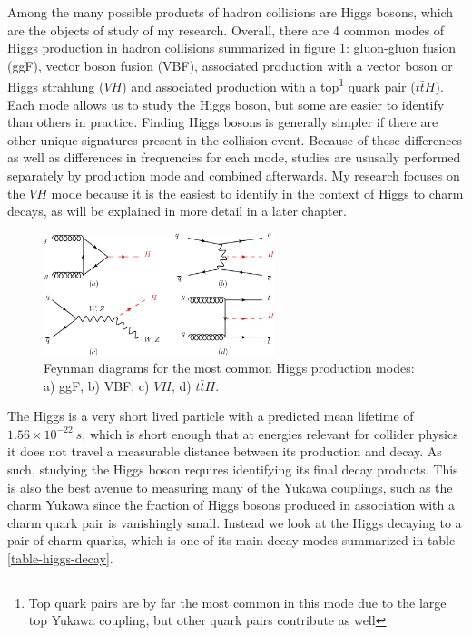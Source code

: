 Among the many possible products of hadron collisions are Higgs bosons, which are the objects of study of my 
research. Overall, there are 4 common modes of Higgs production in hadron collisions summarized in figure 
\ref{fig:Higgs_Production}: gluon-gluon fusion (ggF),  vector boson fusion (VBF), associated production with a 
vector boson or Higgs strahlung ($VH$) and associated production with a top\footnote{Top quark pairs are by far 
the most common in this mode due to the large top Yukawa coupling, but other quark pairs contribute as well} quark 
pair ($t\bar{t}H$). Each mode allows us to study the Higgs boson, but some are easier to identify than others in 
practice. Finding Higgs bosons is generally simpler if there are other unique signatures present in the collision event.
Because of these differences as well as differences in frequencies for each mode, studies are ususally performed 
separately by production mode and combined afterwards. My research focuses on the $VH$ mode because it is 
the easiest to identify in the context of Higgs to charm decays, as will be explained in more detail in a later 
chapter. \par

\begin{figure}
\centering
    \includegraphics[width=0.6\textwidth]{images/Higgs_Production.png}
    \caption{Feynman diagrams for the most common Higgs production modes: a) ggF, b) VBF, c) $VH$, 
    d) $t\bar{t}H$.}
    \label{fig:Higgs_Production}
\end{figure}

The Higgs is a very short lived particle with a predicted mean lifetime of $1.56 \times 10^{-22}\ s$, which is short 
enough that at energies relevant for collider physics it does not travel a measurable distance between its production 
and decay. As such, studying the Higgs boson requires identifying its final decay products. This is also the best avenue 
to measuring many of the Yukawa couplings, such as the charm Yukawa since the fraction of Higgs bosons produced 
in association with a charm quark pair is vanishingly small. Instead we look at the Higgs decaying to a pair of charm 
quarks, which is one of its main decay modes summarized in table \ref{table-higgs-decay}. \par

